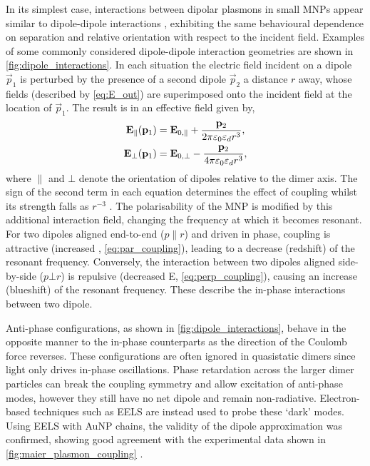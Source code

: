 \documentclass{article}
\begin{document}
In its simplest case, interactions between dipolar plasmons in small MNPs appear similar to dipole-dipole interactions \cite{kreibig1995optical, maier2002, gluodenis2002, rechberger2003, atay2004}, exhibiting the same behavioural dependence on separation and relative orientation with respect to the incident field. Examples of some commonly considered dipole-dipole interaction geometries are shown in \autoref{fig:dipole_interactions}. In each situation the electric field incident on a dipole $\vec{p}_1$ is perturbed by the presence of a second dipole $\vec{p}_2$ a distance $r$ away, whose fields (described by \eqref{eq:E_out}) are superimposed onto the incident field at the location of $\vec{p}_1$. The result is in an effective field given by,
\begin{subequations}
\begin{align}
	\mathbf{E}_{\parallel}(\mathbf{p}_1) &= \mathbf{E}_{0,\parallel} + \frac{\mathbf{p}_2}{2\pi\varepsilon_0\varepsilon_d r^3}, \label{eq:par_coupling} \\
	\mathbf{E}_{\bot}(\mathbf{p}_1) &= \mathbf{E}_{0,\bot} - \frac{\mathbf{p}_2}{4\pi\varepsilon_0\varepsilon_d r^3}, \label{eq:perp_coupling}
\end{align}
\end{subequations}
where $\parallel$ and $\bot$ denote the orientation of dipoles relative to the dimer axis. The sign of the second term in each equation determines the effect of coupling whilst its strength falls as $r^{-3}$ \cite{halas2011}. The polarisability of the MNP is modified by this additional interaction field, changing the frequency at which it becomes resonant.
For two dipoles aligned end-to-end ($p \parallel r$) and driven in phase, coupling is attractive (increased , \eqref{eq:par_coupling}), leading to a decrease (redshift) of the resonant frequency. Conversely, the interaction between two dipoles aligned side-by-side ($p \bot r$) is repulsive (decreased E, \eqref{eq:perp_coupling}), causing an increase (blueshift) of the resonant frequency. These describe the in-phase interactions between two dipole.

Anti-phase configurations, as shown in \autoref{fig:dipole_interactions}, behave in the opposite manner to the in-phase counterparts as the direction of the Coulomb force reverses. These configurations are often ignored in quasistatic dimers since light only drives in-phase oscillations. Phase retardation across the larger dimer particles can break the coupling symmetry and allow excitation of anti-phase modes, however they still have no net dipole and remain non-radiative. Electron-based techniques such as EELS are instead used to probe these `dark' modes. Using EELS with AuNP chains, the validity of the dipole approximation was confirmed, showing good agreement with the experimental data shown in \autoref{fig:maier_plasmon_coupling} \cite{maier2002}.
\end{document}
